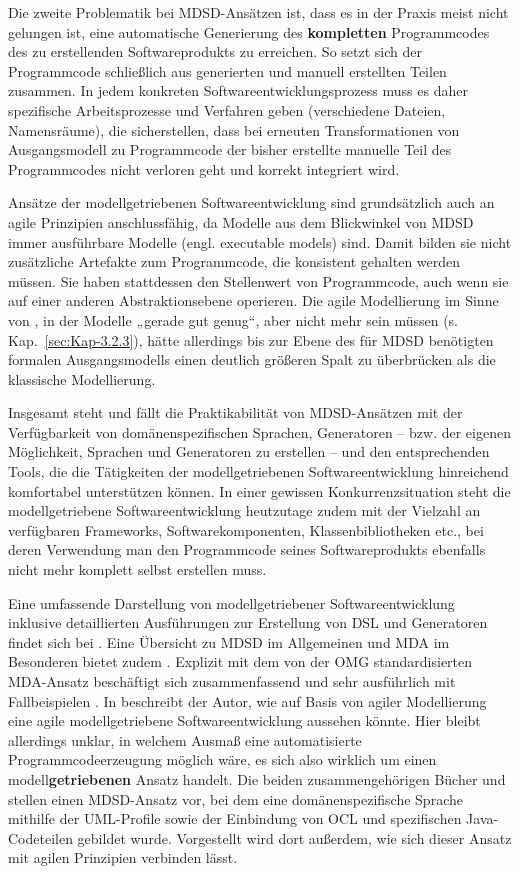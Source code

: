 Die zweite Problematik bei MDSD-Ansätzen ist, dass es in der Praxis meist nicht gelungen ist, eine automatische Generierung des \textbf{kompletten} Programmcodes des zu erstellenden Softwareprodukts zu erreichen. So setzt sich der Programmcode schließlich aus generierten und manuell erstellten Teilen zusammen. In jedem konkreten Softwareentwicklungsprozess muss es daher spezifische Arbeitsprozesse und Verfahren geben (\zb verschiedene Dateien, Namensräume), die sicherstellen, dass bei erneuten Transformationen von Ausgangsmodell zu Programmcode der bisher erstellte manuelle Teil des Programmcodes nicht verloren geht und korrekt integriert wird.

Ansätze der modellgetriebenen Softwareentwicklung 
sind grundsätzlich auch an agile Prinzipien anschlussfähig, da Modelle aus dem Blickwinkel von MDSD immer ausführbare Modelle (engl. executable models) sind. Damit bilden sie nicht zusätzliche Artefakte zum Programmcode, die konsistent gehalten werden müssen. Sie haben stattdessen den Stellenwert von Programmcode, auch wenn sie auf einer anderen Abstraktionsebene operieren. Die agile Modellierung im Sinne von \cite{amb02}, in der Modelle „gerade gut genug“, aber nicht mehr sein müssen (s. Kap.~\ref{sec:Kap-3.2.3}), hätte allerdings bis zur Ebene des für MDSD benötigten formalen Ausgangsmodells einen deutlich größeren Spalt zu überbrücken als die klassische Modellierung. 

Insgesamt steht und fällt die Praktikabilität von MDSD-Ansätzen mit der Verfügbarkeit von domänenspezifischen Sprachen, Generatoren – bzw. der eigenen Möglichkeit, Sprachen und Generatoren zu erstellen – und den entsprechenden Tools, die die Tätigkeiten der modellgetriebenen Softwareentwicklung hinreichend komfortabel unterstützen können. In einer gewissen Konkurrenzsituation steht die modellgetriebene Softwareentwicklung heutzutage zudem mit der Vielzahl an verfügbaren Frameworks, Softwarekomponenten, Klassenbibliotheken etc., bei deren Verwendung man den Programmcode seines Softwareprodukts ebenfalls nicht mehr komplett selbst erstellen muss.

Eine umfassende Darstellung 
von modellgetriebener Softwareentwicklung inklusive detaillierten Ausführungen zur Erstellung von DSL und Generatoren findet sich bei \cite{sta07}. Eine Übersicht zu MDSD im Allgemeinen und MDA im Besonderen bietet zudem \cite{tro07}. Explizit mit dem von der OMG standardisierten MDA-Ansatz beschäftigt sich zusammenfassend \cite[184-187]{som18} und sehr ausführlich mit Fallbeispielen \cite{pet06}. In \cite[101 \psqq]{amb04} beschreibt der Autor, wie auf Basis von agiler Modellierung eine agile modellgetriebene Softwareentwicklung aussehen könnte. Hier bleibt allerdings unklar, in welchem Ausmaß eine automatisierte Programmcodeerzeugung möglich wäre, es sich also wirklich um einen modell\textbf{getriebenen} Ansatz handelt. Die beiden zusammengehörigen Bücher \cite{rum11} und \cite{rum12} stellen einen MDSD-Ansatz vor, bei dem eine domänenspezifische Sprache mithilfe der UML-Profile sowie der Einbindung von OCL und spezifischen Java-Codeteilen gebildet wurde. Vorgestellt wird dort außerdem, wie sich dieser Ansatz mit agilen Prinzipien verbinden lässt.